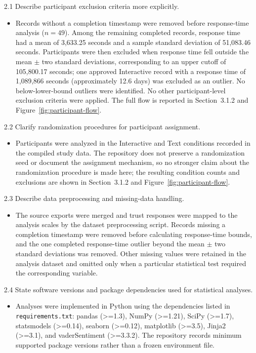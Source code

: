 2.1  Describe participant exclusion criteria more explicitly.
\begin{itemize}
\item[Response:] Records without a completion timestamp were removed before response-time analysis ($n=49$). Among the remaining completed records, response time had a mean of 3,633.25 seconds and a sample standard deviation of 51,083.46 seconds. Participants were then excluded when response time fell outside the mean $\pm$ two standard deviations, corresponding to an upper cutoff of 105,800.17 seconds; one approved Interactive record with a response time of 1,089,866 seconds (approximately 12.6 days) was excluded as an outlier. No below-lower-bound outliers were identified. No other participant-level exclusion criteria were applied. The full flow is reported in Section~3.1.2 and Figure~\ref{fig:participant-flow}.
\end{itemize}

2.2  Clarify randomization procedures for participant assignment.
\begin{itemize}
\item[Response:] Participants were analyzed in the Interactive and Text conditions recorded in the compiled study data. The repository does not preserve a randomization seed or document the assignment mechanism, so no stronger claim about the randomization procedure is made here; the resulting condition counts and exclusions are shown in Section~3.1.2 and Figure~\ref{fig:participant-flow}.
\end{itemize}

2.3  Describe data preprocessing and missing-data handling.
\begin{itemize}
\item[Response:] The source exports were merged and trust responses were mapped to the analysis scales by the dataset preprocessing script. Records missing a completion timestamp were removed before calculating response-time bounds, and the one completed response-time outlier beyond the mean $\pm$ two standard deviations was removed. Other missing values were retained in the analysis dataset and omitted only when a particular statistical test required the corresponding variable.
\end{itemize}

2.4  State software versions and package dependencies used for statistical analyses.
\begin{itemize}
\item[Response:] Analyses were implemented in Python using the dependencies listed in \texttt{requirements.txt}: pandas (\textgreater=1.3), NumPy (\textgreater=1.21), SciPy (\textgreater=1.7), statsmodels (\textgreater=0.14), seaborn (\textgreater=0.12), matplotlib (\textgreater=3.5), Jinja2 (\textgreater=3.1), and vaderSentiment (\textgreater=3.3.2). The repository records minimum supported package versions rather than a frozen environment file.
\end{itemize}

